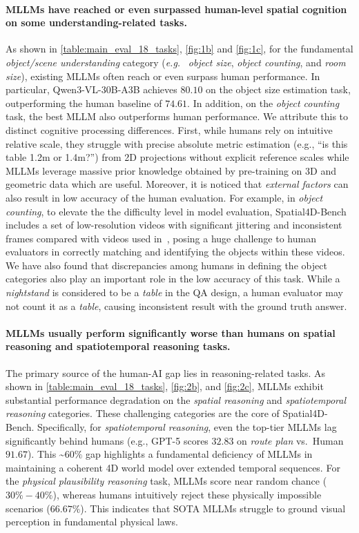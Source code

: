\documentclass{article}
\newcommand{\eg}{\textit{e.g.}}
\begin{document}
\paragraph{MLLMs have reached or even surpassed human-level spatial cognition on some understanding-related tasks.}
As shown in \cref{table:main_eval_18_tasks}, \cref{fig:1b} and \cref{fig:1c}, for the fundamental \textit{object/scene understanding} category (\eg~ \textit{object size}, \textit{object counting}, and \textit{room size}), existing MLLMs often reach or even surpass human performance.
In particular, Qwen3-VL-30B-A3B achieves $80.10$ on the object size estimation task, outperforming the human baseline of $74.61$.
In addition, on the \textit{object counting} task, the best MLLM also outperforms human performance. We attribute this to distinct cognitive processing differences. 
First, while humans rely on intuitive relative scale, they struggle with precise absolute metric estimation (e.g., ``is this table 1.2m or 1.4m?'') from 2D projections without explicit reference scales while MLLMs leverage massive prior knowledge obtained by pre-training on 3D and geometric data which are useful. Moreover, it is noticed that \textit{external factors} can also result in low accuracy of the human evaluation. For example, in \textit{object counting}, to elevate the the difficulty level in model evaluation, Spatial4D-Bench includes a set of low-resolution videos with significant jittering and inconsistent frames compared with videos used in~\cite{Yang_2025_CVPR}, posing a huge challenge to human evaluators in correctly matching and identifying the objects within these videos. We have also found that discrepancies among humans in defining the object categories also play an important role in the low accuracy of this task. While a \textit{nightstand} is considered to be a \textit{table} in the QA design, a human evaluator may not count it as a \textit{table}, causing inconsistent result with the ground truth answer.

\paragraph{MLLMs usually perform significantly worse than humans on spatial reasoning and spatiotemporal reasoning tasks.} The primary source of the human-AI gap lies in reasoning-related tasks.
As shown in \cref{table:main_eval_18_tasks}, \cref{fig:2b}, and \cref{fig:2c}, MLLMs exhibit substantial performance degradation on the \textit{spatial reasoning} and \textit{spatiotemporal reasoning} categories.
These challenging categories are the core of Spatial4D-Bench.
Specifically, for \textit{spatiotemporal reasoning}, even the top-tier MLLMs lag significantly behind humans (e.g., GPT-5 scores $32.83$ on \textit{route plan} vs.\ Human $91.67$).
This \textasciitilde$60\%$ gap highlights a fundamental deficiency of MLLMs in maintaining a coherent 4D world model over extended temporal sequences.
For the \textit{physical plausibility reasoning} task, MLLMs score near random chance ($30\%-40\%$), whereas humans intuitively reject these physically impossible scenarios ($66.67\%$).
This indicates that SOTA MLLMs struggle to ground visual perception in fundamental physical laws.
\end{document}
